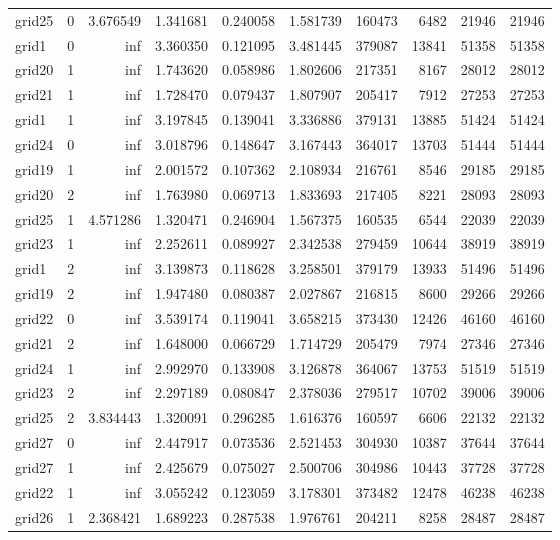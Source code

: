 \begin{longtable}{|l|r|r|r|r|r|r|r|r|r|}
grid25 & 0 & 3.676549 & 1.341681 & 0.240058 & 1.581739 & 160473 & 6482 & 21946 & 21946 \\
grid1 & 0 & inf & 3.360350 & 0.121095 & 3.481445 & 379087 & 13841 & 51358 & 51358 \\
grid20 & 1 & inf & 1.743620 & 0.058986 & 1.802606 & 217351 & 8167 & 28012 & 28012 \\
grid21 & 1 & inf & 1.728470 & 0.079437 & 1.807907 & 205417 & 7912 & 27253 & 27253 \\
grid1 & 1 & inf & 3.197845 & 0.139041 & 3.336886 & 379131 & 13885 & 51424 & 51424 \\
grid24 & 0 & inf & 3.018796 & 0.148647 & 3.167443 & 364017 & 13703 & 51444 & 51444 \\
grid19 & 1 & inf & 2.001572 & 0.107362 & 2.108934 & 216761 & 8546 & 29185 & 29185 \\
grid20 & 2 & inf & 1.763980 & 0.069713 & 1.833693 & 217405 & 8221 & 28093 & 28093 \\
grid25 & 1 & 4.571286 & 1.320471 & 0.246904 & 1.567375 & 160535 & 6544 & 22039 & 22039 \\
grid23 & 1 & inf & 2.252611 & 0.089927 & 2.342538 & 279459 & 10644 & 38919 & 38919 \\
grid1 & 2 & inf & 3.139873 & 0.118628 & 3.258501 & 379179 & 13933 & 51496 & 51496 \\
grid19 & 2 & inf & 1.947480 & 0.080387 & 2.027867 & 216815 & 8600 & 29266 & 29266 \\
grid22 & 0 & inf & 3.539174 & 0.119041 & 3.658215 & 373430 & 12426 & 46160 & 46160 \\
grid21 & 2 & inf & 1.648000 & 0.066729 & 1.714729 & 205479 & 7974 & 27346 & 27346 \\
grid24 & 1 & inf & 2.992970 & 0.133908 & 3.126878 & 364067 & 13753 & 51519 & 51519 \\
grid23 & 2 & inf & 2.297189 & 0.080847 & 2.378036 & 279517 & 10702 & 39006 & 39006 \\
grid25 & 2 & 3.834443 & 1.320091 & 0.296285 & 1.616376 & 160597 & 6606 & 22132 & 22132 \\
grid27 & 0 & inf & 2.447917 & 0.073536 & 2.521453 & 304930 & 10387 & 37644 & 37644 \\
grid27 & 1 & inf & 2.425679 & 0.075027 & 2.500706 & 304986 & 10443 & 37728 & 37728 \\
grid22 & 1 & inf & 3.055242 & 0.123059 & 3.178301 & 373482 & 12478 & 46238 & 46238 \\
grid26 & 1 & 2.368421 & 1.689223 & 0.287538 & 1.976761 & 204211 & 8258 & 28487 & 28487 \\

\end{longtable}
